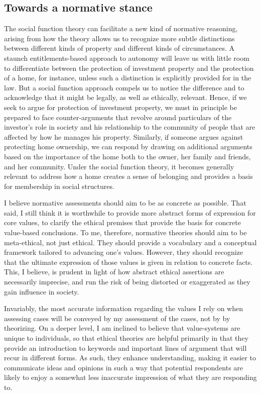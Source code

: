 \subsection{Towards a normative stance}

The social function theory can facilitate a new kind of normative reasoning, arising from how the theory allows us to recognize more subtle distinctions between different kinds of property and different kinds of circumstances. A staunch entitlements-based approach to autonomy will leave us with little room to differentiate between the protection of investment property and the protection of a home, for instance, unless such a distinction is explicitly provided for in the law. But a social function approach compels us to notice the difference and to acknowledge that it might be legally, as well as ethically, relevant. Hence, if we seek to argue for protection of investment property, we must in principle be prepared to face counter-arguments that revolve around particulars of the investor's role in society and his relationship to the community of people that are affected by how he manages his property. Similarly, if someone argues against protecting home ownership, we can respond by drawing on additional arguments based on the importance of the home both to the owner, her family and friends, and her community. Under the social function theory, it becomes generally relevant to address how a home creates a sense of belonging and provides a basis for membership in social structures.

I believe normative assessments should aim to be as concrete as possible. That said, I still think it is worthwhile to provide more abstract forms of expression for core values, to clarify the ethical premises that provide the basis for concrete value-based conclusions. To me, therefore, normative theories should aim to be meta-ethical, not just ethical. They should provide a vocabulary and a conceptual framework tailored to advancing one's values. However, they should recognize that the ultimate expression of those values is given in relation to concrete facts. This, I believe, is prudent in light of how abstract ethical assertions are necessarily imprecise, and run the risk of being distorted or exaggerated as they gain influence in society.

Invariably, the most accurate information regarding the values I rely on when assessing cases will be conveyed by my assessment of the cases, not by by theorizing. On a deeper level, I am inclined to believe that value-systems are unique to individuals, so that ethical theories are helpful primarily in that they provide an introduction to keywords and important lines of argument that will recur in different forms. As such, they enhance understanding, making it easier to communicate ideas and opinions in such a way that potential respondents are likely to enjoy a somewhat less inaccurate impression of what they are responding to. 

